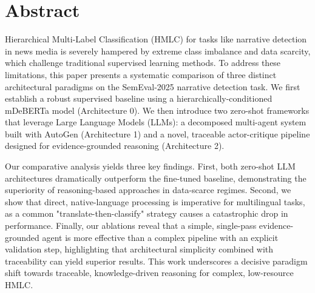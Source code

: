 \chapter*{Abstract}

Hierarchical Multi-Label Classification (HMLC) for tasks like narrative detection in news media is severely hampered by extreme class imbalance and data scarcity, which challenge traditional supervised learning methods. To address these limitations, this paper presents a systematic comparison of three distinct architectural paradigms on the SemEval-2025 narrative detection task. We first establish a robust supervised baseline using a hierarchically-conditioned mDeBERTa model (Architecture 0). We then introduce two zero-shot frameworks that leverage Large Language Models (LLMs): a decomposed multi-agent system built with AutoGen (Architecture 1) and a novel, traceable actor-critique pipeline designed for evidence-grounded reasoning (Architecture 2).

Our comparative analysis yields three key findings. First, both zero-shot LLM architectures dramatically outperform the fine-tuned baseline, demonstrating the superiority of reasoning-based approaches in data-scarce regimes. Second, we show that direct, native-language processing is imperative for multilingual tasks, as a common "translate-then-classify" strategy causes a catastrophic drop in performance. Finally, our ablations reveal that a simple, single-pass evidence-grounded agent is more effective than a complex pipeline with an explicit validation step, highlighting that architectural simplicity combined with traceability can yield superior results. This work underscores a decisive paradigm shift towards traceable, knowledge-driven reasoning for complex, low-resource HMLC.
